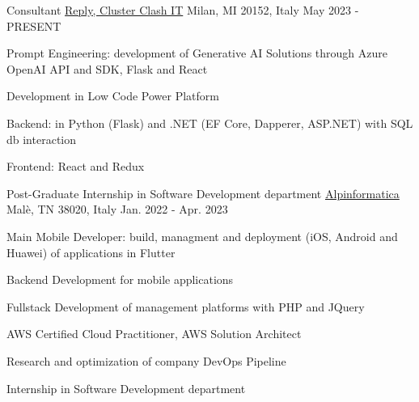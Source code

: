 

\begin{cventries}
  \cventry
    {Consultant} %
    {\href{www.reply.com/}{Reply, Cluster Clash IT}} %
    {Milan, MI 20152, Italy} %
    {May 2023 - PRESENT} %
    {
      \begin{cvitems} %
        \item {Prompt Engineering: development of Generative AI Solutions through Azure OpenAI API and SDK, Flask and React}
        \item {Development in Low Code Power Platform}
        \item {Backend: in Python (Flask) and .NET (EF Core, Dapperer, ASP.NET) with SQL db interaction}
        \item {Frontend: React and Redux}
      \end{cvitems}
      }
  \cventry
    {Post-Graduate Internship in Software Development department} %
    {\href{https://www.alpinformatica.com/}{Alpinformatica}} %
    {Malè, TN 38020, Italy} %
    {Jan. 2022 - Apr. 2023} %
    {
      \begin{cvitems} %
        \item {Main Mobile Developer: build, managment and deployment (iOS, Android and Huawei) of applications in Flutter}
        \item {Backend Development for mobile applications}
        \item {Fullstack Development of management platforms with PHP and JQuery}
        \item {AWS Certified Cloud Practitioner, AWS Solution Architect}
        \item {Research and optimization of company DevOps Pipeline}
      \end{cvitems}
      }
  \cventry
    {Internship in Software Development department} %

\end{cventries}
